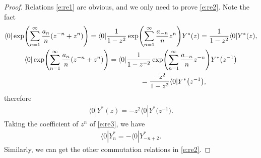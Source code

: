 \documentclass[10pt,a4paper]{amsart}
\numberwithin{equation}{section}
\begin{document}
\begin{proof}
Relations \eqref{e:re1} are obvious, and we only need to prove \eqref{e:re2}. Note the fact
\begin{gather*}
\langle 0|\exp\Biggl(\sum^\infty_{n=1}\frac{a_n}{n}(z^{-n}+z^n)\Biggr)=\langle 0|\frac{1}{1-z^2}\exp\Biggl(\sum^\infty_{n=1}\frac{a_{-n}}{n}z^n\Biggr)Y^*(z)
=\frac{1}{1-z^2}\langle 0|Y^*(z),\\
\langle 0|\exp\Biggl(\sum^\infty_{n=1}\frac{a_n}{n}(z^{-n}+z^n)\Biggr)=\langle 0|\frac{1}{1-z^{-2}}\exp\Biggl(\sum^\infty_{n=1}\frac{a_{-n}}{n}z^{-n}\Biggr)Y^*\big(z^{-1}\big)\\
\hphantom{\langle 0|\exp\Biggl(\sum^\infty_{n=1}\frac{a_n}{n}(z^{-n}+z^n)\Biggr)}{}
=\frac{-z^2}{1-z^2}\langle 0|Y^*\big(z^{-1}\big),
\end{gather*}
therefore
\begin{align}
\label{e:re3}\langle 0|Y^*(z)=-z^2\langle 0|Y^*\big(z^{-1}\big).
\end{align}
Taking the coefficient of $z^n$ of \eqref{e:re3}, we have
\begin{align*}
\langle 0|Y^*_n=-\langle 0|Y^*_{-n+2}.
\end{align*}
Similarly, we can get the other commutation relations in \eqref{e:re2}.
\end{proof}
\end{document}
